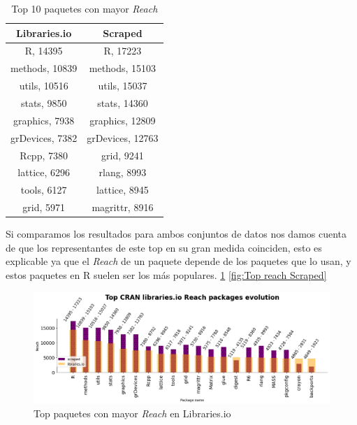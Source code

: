 \begin{table}[ht!]
    \begin{center}
        \begin{tabular}{|c|c|}
            \hline
            \textbf{Libraries.io} & \textbf{Scraped} \\
            \hline
            R, 14395              & R, 17223         \\
            methods, 10839        & methods, 15103   \\
            utils, 10516          & utils, 15037     \\
            stats, 9850           & stats, 14360     \\
            graphics, 7938        & graphics, 12809  \\
            grDevices, 7382       & grDevices, 12763 \\
            Rcpp, 7380            & grid, 9241       \\
            lattice, 6296         & rlang, 8993      \\
            tools, 6127           & lattice, 8945    \\
            grid, 5971            & magrittr, 8916   \\
            \hline
        \end{tabular}
        \caption{Top 10 paquetes con mayor \textit{Reach}}
        \label{tab:Top 10 paquetes con mayor Reach}
    \end{center}
\end{table}

Si comparamos los resultados para ambos conjuntos de datos nos damos cuenta de que
los representantes de este top en su gran medida coinciden, esto es explicable ya que
el \textit{Reach} de un paquete depende de los paquetes que lo usan, y estos paquetes
en R suelen ser los más populares. \ref{fig:Top reach Libraries.io} \ref{fig:Top reach Scraped}


\begin{figure}[ht!]
    \begin{center}
        \includegraphics[width=1\textwidth]{img/cran/reach_top.png}
        \caption{Top paquetes con mayor \textit{Reach} en Libraries.io}
        \label{fig:Top reach Libraries.io}
    \end{center}
\end{figure}


